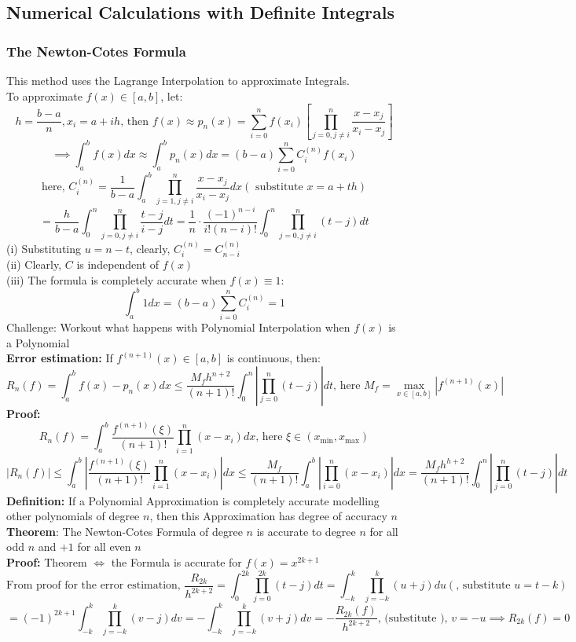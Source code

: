 \documentclass{article}
\newcommand{\0}{{\bf{0}}}
\begin{document}
\subsection{Numerical Calculations with Definite Integrals}
\subsubsection{The Newton-Cotes Formula}
This method uses the Lagrange Interpolation to approximate Integrals.\\
To approximate $f(x)\in[a,b]$, let:
$$h=\frac{b-a}{n},x_i=a+ih\mbox{, then } f(x)\approx p_n(x)=\sum_{i=0}^nf(x_i)\left[\prod_{j=0,j\neq{}i}^n\frac{x-x_j}{x_i-x_j}\right]$$
$$\implies\int_a^bf(x)dx\approx{}\int_a^bp_n(x)dx=(b-a)\sum_{i=0}^nC_i^{(n)}f(x_i)$$
$$\mbox{here, }C_i^{(n)}=\frac{1}{b-a}\int_a^b\prod_{j=1,j\neq{i}}^n\frac{x-x_j}{x_i-x_j}dx(\mbox{ substitute }x=a+th)$$
$$=\frac{h}{b-a}\int_0^n\prod_{j=0,j\neq{}i}^n\frac{t-j}{i-j}dt=\frac{1}{n}\cdot\frac{(-1)^{n-i}}{i!(n-i)!}\int_0^n\prod_{j=0,j\neq{}i}^n(t-j)dt$$
(i) Substituting $u=n-t$, clearly, $C_i^{(n)}=C_{n-i}^{(n)}$\\
(ii) Clearly, $C$ is independent of $f(x)$\\
(iii) The formula is completely accurate when $f(x)\equiv{1}$:
$$\int_a^b1dx=(b-a)\sum_{i=0}^nC_i^{(n)}=1$$
Challenge: Workout what happens with Polynomial Interpolation when $f(x)$ is a Polynomial\\
{\textbf{Error estimation:}} If $f^{(n+1)}(x)\in[a,b]$ is continuous, then: $$R_n(f)=\int_a^bf(x)-p_n(x)dx\le{}\frac{M_fh^{n+2}}{(n+1)!}\int_0^n\left|\prod_{j=0}^n(t-j)\right|dt\mbox{, here }M_f=\max_{x\in[a,b]}\left|f^{(n+1)}(x)\right|$$
\textbf{Proof:}
$$R_n(f)=\int_a^b\frac{f^{(n+1)}(\xi)}{(n+1)!}\prod_{i=1}^n(x-x_i)dx\mbox{, here }\xi\in(x_{\min},x_{\max})$$
$$\left|R_n(f)\right|\le\int_a^b\left|\frac{f^{(n+1)}(\xi)}{(n+1)!}\prod_{i=1}^n(x-x_i)\right|dx\le\frac{M_f}{(n+1)!}\int_a^b\left|\prod_{i=0}^n(x-x_i)\right|dx=\frac{M_fh^{h+2}}{(n+1)!}\int_0^n\left|\prod_{j=0}^n(t-j)\right|dt$$
\textbf{Definition: }If a Polynomial Approximation is completely accurate modelling other polynomials of degree $n$, then this Approximation has degree of accuracy $n$\\
\textbf{Theorem}: The Newton-Cotes Formula of degree $n$ is accurate to degree $n$ for all odd $n$ and $+1$ for all even $n$\\
\textbf{Proof:} Theorem $\iff$ the Formula is accurate for $f(x) = x^{2k+1}$
$$\mbox{From proof for the error estimation, }\frac{R_{2k}}{h^{2k+2}}=\int_0^{2k}\prod_{j=0}^{2k}(t-j)dt=\int_{-k}^{k}\prod_{j=-k}^{k}(u+j)du(\mbox{, substitute }u=t-k)$$
$$=(-1)^{2k+1}\int_{-k}^k\prod_{j=-k}^k(v-j)dv=-\int_{-k}^k\prod_{j=-k}^k(v+j)dv=-\frac{R_{2k}(f)}{h^{2k+2}}\mbox{, (substitute ), }v=-u\implies R_{2k}(f)=0$$
\end{document}
